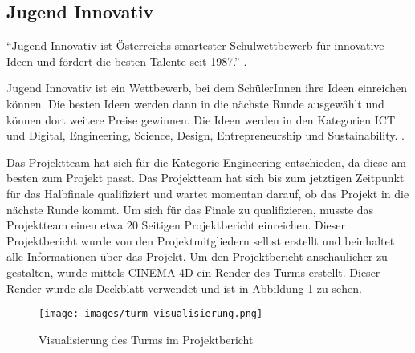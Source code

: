 \subsection{Jugend Innovativ}

\enquote{Jugend Innovativ ist Österreichs smartester Schulwettbewerb für innovative Ideen und fördert die besten Talente seit 1987.} .

Jugend Innovativ ist ein Wettbewerb, bei dem SchülerInnen ihre Ideen einreichen können. Die besten Ideen werden dann in die nächste Runde ausgewählt und können dort weitere Preise gewinnen. Die Ideen werden in den Kategorien ICT und Digital, Engineering, Science, Design, Entrepreneurship und Sustainability. .

Das Projektteam hat sich für die Kategorie Engineering entschieden, da diese am besten zum Projekt passt. Das Projektteam hat sich bis zum jetztigen Zeitpunkt für das Halbfinale qualifiziert und wartet momentan darauf, ob das Projekt in die nächste Runde kommt. Um sich für das Finale zu qualifizieren, musste das Projektteam einen etwa 20 Seitigen Projektbericht einreichen. Dieser Projektbericht wurde von den Projektmitgliedern selbst erstellt und beinhaltet alle Informationen über das Projekt. Um den Projektbericht anschaulicher zu gestalten, wurde mittels CINEMA 4D ein Render des Turms erstellt. Dieser Render wurde als Deckblatt verwendet und ist in Abbildung \ref{fig:turm_visualisierung} zu sehen.

\begin{figure}[H]
    \centering
    \texttt{[image: images/turm\_visualisierung.png]}
    \caption{Visualisierung des Turms im Projektbericht}
    \label{fig:turm_visualisierung}
\end{figure}